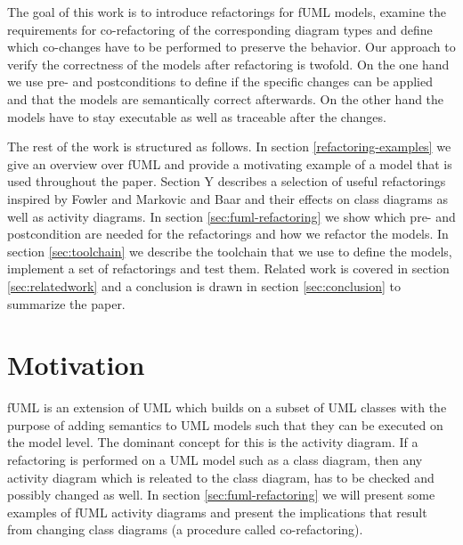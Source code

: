 \documentclass{llncs}
\begin{document}

The goal of this work is to introduce refactorings for fUML models, examine the requirements for co-refactoring of the
corresponding diagram types and define which co-changes have to be performed to preserve the behavior. Our approach to
verify
the correctness of the models after refactoring is twofold. On the one hand we use pre- and postconditions
\cite{rob99} to define if the specific changes can be applied and that the models are semantically correct afterwards.
On the other hand the models have to stay executable as well as traceable after the changes.



The rest of the work is structured as follows. In section \ref{refactoring-examples} we give an overview over fUML and provide
a motivating
example of a model that is used throughout the paper. Section Y describes a selection of useful refactorings inspired by
Fowler \cite{fow99} and Markovic and Baar \cite{DBLP:journals/sosym/MarkovicB08} and their effects on class diagrams as
well as activity diagrams. In section \ref{sec:fuml-refactoring} we show which pre- and postcondition are needed for the refactorings and
how we refactor the models. In section \ref{sec:toolchain} we describe the toolchain that we use to define the models, 
implement a set of refactorings and test them. Related work is covered in section \ref{sec:relatedwork} and a conclusion is drawn in 
section \ref{sec:conclusion} to summarize the paper.



\section{Motivation}
fUML is an extension of UML which builds on a subset of UML classes with the purpose of adding semantics to UML models 
such that they can be executed on the model level. The dominant concept for this is the activity diagram. If a refactoring 
is performed on a UML model such as a class diagram, then any activity diagram which is releated to the class diagram, has 
to be checked and possibly changed as well. In section \ref{sec:fuml-refactoring} we will present some examples of fUML 
activity diagrams and present the implications  that result from changing class 
diagrams (a procedure called co-refactoring).
\end{document}
